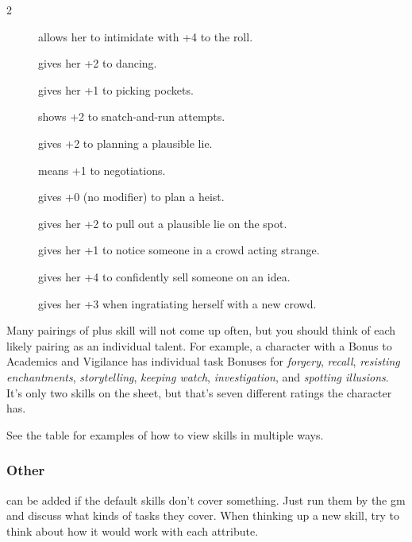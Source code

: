 \begin{multicols}{2}
\begin{description}
  \item[]
    allows her to intimidate with +4 to the roll.
  \item[]
    gives her +2 to dancing.
  \item[]
    gives her +1 to picking pockets.
  \item[]
    shows +2 to snatch-and-run attempts.
  \item[]
    gives +2 to planning a plausible lie.
  \item[]
    means +1 to negotiations.
  \item[]
    gives +0 (no modifier) to plan a heist.
  \item[]
    gives her +2 to pull out a plausible lie on the spot.
  \item[]
    gives her +1 to notice someone in a crowd acting strange.
  \item[]
    gives her +4 to confidently sell someone on an idea.
  \item[]
    gives her +3 when ingratiating herself with a new crowd.
\end{description}

Many pairings of  plus \gls{skill} will not come up often, but you should think of each likely pairing as an individual talent.
For example, a character with a Bonus to Academics and Vigilance has individual task Bonuses for \textit{forgery}, \textit{recall}, \textit{resisting enchantments}, \textit{storytelling}, \textit{keeping watch}, \textit{investigation}, and \textit{spotting illusions}.
It's only two \glspl{skill} on the sheet, but that's seven different ratings the character has.

See the table  for examples of how to view \glspl{skill} in multiple ways.

\bigSkillsTable

\subsubsection{Other }
can be added if the default \glspl{skill} don't cover something.
Just run them by the \gls{gm} and discuss what kinds of tasks they cover.
When thinking up a new \gls{skill}, try to think about how it would work with each \gls{attribute}.


\end{multicols}
